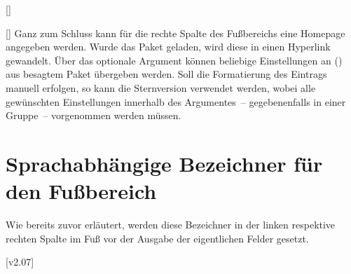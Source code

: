 \begin{DeclareEntity}{}
\begin{Declaration}
  {[]}
\begin{Declaration}
  {[]}
\printdeclarationlist
%
Ganz zum Schluss kann für die rechte Spalte des Fußbereichs eine Homepage 
angegeben werden. Wurde das Paket  geladen, wird diese in 
einen Hyperlink gewandelt. Über das optionale Argument können beliebige 
Einstellungen an () aus besagtem Paket 
übergeben werden. Soll die Formatierung des Eintrags manuell erfolgen, so kann 
die Sternversion  verwendet werden, wobei alle gewünschten 
Einstellungen innerhalb des Argumentes~-- gegebenenfalls in einer Gruppe~-- 
vorgenommen werden müssen.
\end{Declaration}
\end{Declaration}



\section{Sprachabhängige Bezeichner für den Fußbereich}
%
\begin{Declaration}
  {}
\begin{Declaration}
  {}
\begin{Declaration}
  {}
\printdeclarationlist
%
Wie bereits zuvor erläutert, werden diese Bezeichner in der linken respektive 
rechten Spalte im Fuß vor der Ausgabe der eigentlichen Felder gesetzt.
%
\end{Declaration}
\end{Declaration}
\end{Declaration}

[v2.07]
\end{DeclareEntity}
